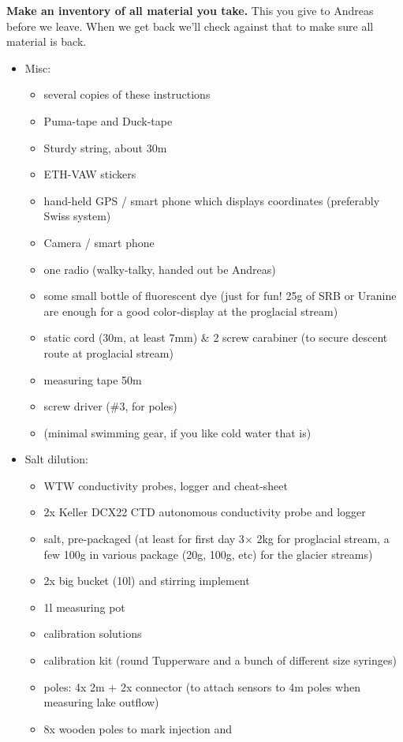 \documentclass[DIV=15,halfparskip,11pt,headinclude]{scrartcl}
\begin{document}
\textbf{Make an inventory of all material you take.} This you give to Andreas before we leave. When we get back we'll check against that to make sure all material is back.
\begin{itemize}
\item Misc:
  \begin{itemize}
  \item several copies of these instructions
  \item Puma-tape and Duck-tape
  \item Sturdy string, about 30m
  \item ETH-VAW stickers
  \item hand-held GPS / smart phone which displays coordinates
    (preferably Swiss system)
  \item Camera / smart phone
  \item one radio (walky-talky, handed out be Andreas)
  \item some small bottle of fluorescent dye (just for fun! 25g of SRB
    or Uranine are enough for a good color-display at the proglacial
    stream)
  \item static cord (30m, at least 7mm) \& 2 screw carabiner (to secure descent route at
    proglacial stream)
  \item measuring tape 50m
  \item screw driver (\#3, for poles)
  \item (minimal swimming gear, if you like cold water that is)
  \end{itemize}
\item Salt dilution:
  \begin{itemize}
  \item WTW conductivity probes, logger and cheat-sheet
  \item 2x Keller DCX22 CTD autonomous conductivity probe and logger
  \item salt, pre-packaged (at least for first day 3$\times$ 2kg for proglacial stream, a
    few 100g in various package (20g, 100g, etc) for the glacier streams)
  \item 2x big bucket (10l) and stirring implement
  \item 1l measuring pot
  \item calibration solutions
  \item calibration kit (round Tupperware and a bunch of different size syringes)
  \item poles: 4x 2m + 2x connector (to attach sensors to 4m poles when measuring
    lake outflow)
  \item 8x wooden poles to mark injection and

\end{itemize}
\end{itemize}
\end{document}
